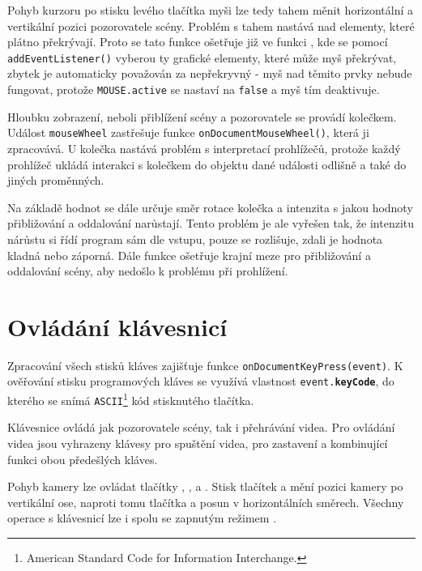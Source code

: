 Pohyb kurzoru po stisku levého tlačítka myši lze tedy tahem měnit horizontální a vertikální pozici pozorovatele scény. Problém s tahem nastává nad elementy, které plátno překrývají. Proto se tato funkce ošetřuje již ve funkci \texttt{\initProgram}, kde se pomocí \\\texttt{addEventListener()} vyberou ty grafické elementy, které může myš překrývat, zbytek je automaticky považován za nepřekryvný - myš nad těmito prvky nebude fungovat, protože \texttt{MOUSE.active} se nastaví na  \texttt{false} a myš tím deaktivuje.

Hloubku zobrazení, neboli přiblížení scény a pozorovatele se provádí kolečkem. Událost \texttt{mouseWheel} zastřešuje funkce \texttt{onDocumentMouseWheel()}, která ji zpracovává. U kolečka nastává problém s interpretací prohlížečů, protože každý prohlížeč ukládá interakci s kolečkem do objektu dané události odlišně a také do jiných proměnných. 

Na základě hodnot se dále určuje směr rotace kolečka a intenzita s jakou hodnoty přibližování a oddalování narůstají. Tento problém je ale vyřešen tak, že intenzitu nárůstu si řídí program sám dle vstupu, pouze se rozlišuje, zdali je hodnota kladná nebo záporná.
Dále funkce ošetřuje krajní meze pro přibližování a oddalování scény, aby nedošlo k problému při prohlížení.
 
 


\section{Ovládání klávesnicí}
Zpracování všech stisků kláves zajišťuje funkce \texttt{onDocumentKeyPress(event)}. K ověřování stisku programových kláves se využívá vlastnost \texttt{event.\textbf{keyCode}}, do kterého se snímá \texttt{ASCII}\footnote{American Standard Code for Information Interchange.} kód stisknutého tlačítka.

Klávesnice ovládá jak pozorovatele scény, tak i přehrávání videa. Pro ovládání videa jsou vyhrazeny klávesy  pro spuštění videa,  pro zastavení a  kombinující funkci obou předešlých kláves.

Pohyb kamery lze ovládat tlačítky , ,   a  . Stisk tlačítek  a  mění pozici kamery po vertikální ose, naproti tomu tlačítka  a   posun v horizontálních směrech. Všechny operace s klávesnicí lze i spolu se zapnutým režimem  .


